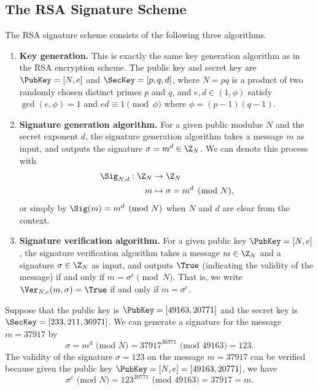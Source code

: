 \subsection{The RSA Signature Scheme}
The RSA signature scheme consists of the following three algorithms. 
\begin{enumerate}
    \item \textbf{Key generation.} This is exactly the same key generation 
    algorithm as in the RSA encryption scheme. The public key and secret 
    key are $\PubKey = [N, e]$ and $\SecKey = [p, q, d]$, where 
    $N = pq$ is a product of two randomly chosen distinct primes $p$ and $q$, 
    and $e, d \in (1, \phi)$ satisfy $\gcd(e, \phi) = 1$ and 
    $ed \equiv 1 \pmod\phi$ where $\phi = (p-1)(q-1)$. 

    \item \textbf{Signature generation algorithm.} For a given public modulus $N$ 
    and the secret exponent $d$, the signature generation algorithm takes a 
    message $m$ as input, and outputs the signature $\sigma = m^d \in \Z_N$. 
    We can denote this process with 
    \begin{align*}
        \Sig_{N,d} : \Z_N &\to \Z_N \\ 
        m &\mapsto \sigma = m^d \pmod N, 
    \end{align*}
    or simply by $\Sig(m) = m^d \pmod N$ when $N$ and $d$ are clear from the context. 

    \item \textbf{Signature verification algorithm.} For a given public key 
    $\PubKey = [N, e]$, the signature verification algorithm takes a message 
    $m \in \Z_N$ and a signature $\sigma \in \Z_N$ as input, and outputs 
    $\True$ (indicating the validity of the message) if and only if 
    $m = \sigma^e \pmod N$. That is, we write $\Ver_{N,e}(m, \sigma) 
    = \True$ if and only if $m = \sigma^e$. 
\end{enumerate}

\begin{exmp}
    Suppose that the public key is $\PubKey = [49163, 20771]$ and the secret key is 
    $\SecKey = [233, 211, 36971]$. We can generate a signature for the message 
    $m = 37917$ by 
    \[ \sigma = m^d \text{ (mod $N$)} = 37917^{36971} \text{ (mod $49163$)} = 123. \] 
    The validity of the signature $\sigma = 123$ on the message $m = 37917$ can be 
    verified because given the public key $\PubKey = [N, e] = [49163, 20771]$, we have 
    \[ \sigma^e \text{ (mod $N$)} = 123^{20771} \text{ (mod $49163$)} = 37917 = m. \] 
\end{exmp}

